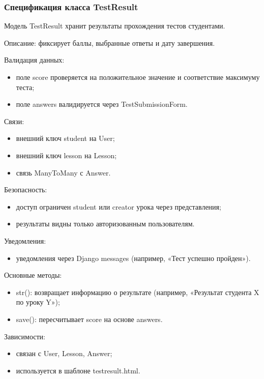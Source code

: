 \subsubsection{Спецификация класса TestResult}

Модель TestResult хранит результаты прохождения тестов студентами.


Описание: фиксирует баллы, выбранные ответы и дату завершения.

Валидация данных:
	\begin{itemize}
		\item поле score проверяется на положительное значение и соответствие максимуму теста;
		\item поле answers валидируется через TestSubmissionForm.
	\end{itemize}
	
Связи:
	\begin{itemize}
		\item внешний ключ student на User;
		\item внешний ключ lesson на Lesson;
		\item связь ManyToMany с Answer.
	\end{itemize}
	
Безопасность:
	\begin{itemize}
		\item доступ ограничен student или creator урока через представления;
		\item результаты видны только авторизованным пользователям.
	\end{itemize}
	
Уведомления:
	\begin{itemize}
		\item уведомления через Django messages (например, «Тест успешно пройден»).
	\end{itemize}
	
Основные методы:
	\begin{itemize}
		\item str(): возвращает информацию о результате (например, «Результат студента X по уроку Y»);
		\item save(): пересчитывает score на основе answers.
	\end{itemize}
	
Зависимости:
	\begin{itemize}
		\item связан с User, Lesson, Answer;
		\item используется в шаблоне testresult.html.
	\end{itemize}

